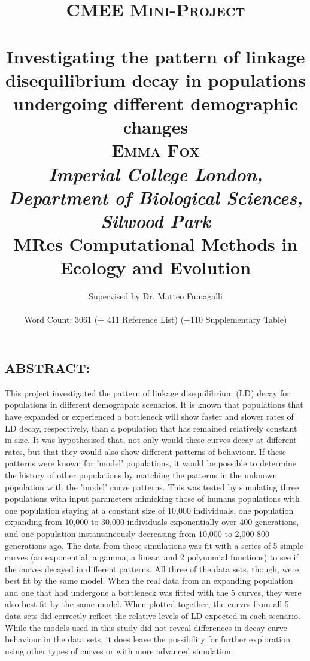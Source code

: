 \documentclass[11pt]{article}
\title{	\huge \textsc{CMEE Mini-Project}
		\\ [3.0cm]
		\HRule{1pt} \\
		\LARGE \textbf{Investigating the pattern of linkage disequilibrium decay in populations undergoing different demographic changes}
		\HRule{1pt} \\ [0.2cm]
		\Large \textsc{Emma Fox} \\
		\large \emph{Imperial College London, Department of Biological Sciences, Silwood Park} \\
		\small MRes Computational Methods in Ecology and Evolution
		\\ [9.0cm]}
\author{ 
		Supervised by Dr. Matteo Fumagalli \\ \\
		Word Count: 3061 (+ 411 Reference List) (+110 Supplementary Table)\\
		}
\date{}
\begin{document}
\maketitle

\newpage
\begin{linenumbers}

\section{ABSTRACT:}
This project investigated the pattern of linkage disequilibrium (LD) decay for populations in different demographic scenarios. It is known that populations that have expanded or experienced a bottleneck will show faster and slower rates of LD decay, respectively, than a population that has remained relatively constant in size. It was hypothesised that, not only would these curves decay at different rates, but that they would also show different patterns of behaviour. If these patterns were known for 'model' populations, it would be possible to determine the history of other populations by matching the patterns in the unknown population with the 'model' curve patterns. This was tested by simulating three populations with input parameters mimicking those of humans populations with one population staying at a constant size of 10,000 individuals, one population expanding from 10,000 to 30,000 individuals exponentially over 400 generations, and one population instantaneously decreasing from 10,000 to 2,000 800 generations ago. The data from these simulations was fit with a series of 5 simple curves (an exponential, a gamma, a linear, and 2 polynomial functions) to see if the curves decayed in different patterns. All three of the data sets, though, were best fit by the same model. When the real data from an expanding population and one that had undergone a bottleneck was fitted with the 5 curves, they were also best fit by the same model. When plotted together, the curves from all 5 data sets did correctly reflect the relative levels of LD expected in each scenario. While the models used in this study did not reveal differences in decay curve behaviour in the data sets, it does leave the possibility for further exploration using other types of curves or with more advanced simulation.     


\end{linenumbers}
\end{document}
